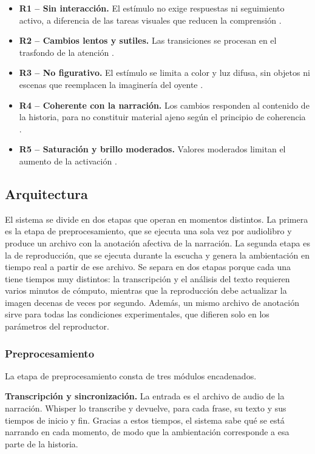 \documentclass[journal]{IEEEtran}
\begin{document}
\begin{itemize}
\item \textbf{R1 -- Sin interacción.} El estímulo no exige respuestas ni seguimiento activo, a diferencia de las tareas visuales que reducen la comprensión \cite{xie2023}.
\item \textbf{R2 -- Cambios lentos y sutiles.} Las transiciones se procesan en el trasfondo de la atención \cite{wisneski1998}.
\item \textbf{R3 -- No figurativo.} El estímulo se limita a color y luz difusa, sin objetos ni escenas que reemplacen la imaginería del oyente \cite{greenbrock2002}.
\item \textbf{R4 -- Coherente con la narración.} Los cambios responden al contenido de la historia, para no constituir material ajeno según el principio de coherencia \cite{mayermoreno2003}.
\item \textbf{R5 -- Saturación y brillo moderados.} Valores moderados limitan el aumento de la activación \cite{wilmsoberfeld2018}.
\end{itemize}
 
\subsection{Arquitectura}
El sistema se divide en dos etapas que operan en momentos distintos. La primera es la etapa de preprocesamiento, que se ejecuta una sola vez por audiolibro y produce un archivo con la anotación afectiva de la narración. La segunda etapa es la de reproducción, que se ejecuta durante la escucha y genera la ambientación en tiempo real a partir de ese archivo. Se separa en dos etapas porque cada una tiene tiempos muy distintos: la transcripción y el análisis del texto requieren varios minutos de cómputo, mientras que la reproducción debe actualizar la imagen decenas de veces por segundo. Además, un mismo archivo de anotación sirve para todas las condiciones experimentales, que difieren solo en los parámetros del reproductor.
 
\subsubsection{Preprocesamiento}
 
La etapa de preprocesamiento consta de tres módulos encadenados.
 
\textbf{Transcripción y sincronización.} La entrada es el archivo de audio de la narración. Whisper \cite{radford2023} lo transcribe y devuelve, para cada frase, su texto y sus tiempos de inicio y fin. Gracias a estos tiempos, el sistema sabe qué se está narrando en cada momento, de modo que la ambientación corresponde a esa parte de la historia.
 
\end{document}
